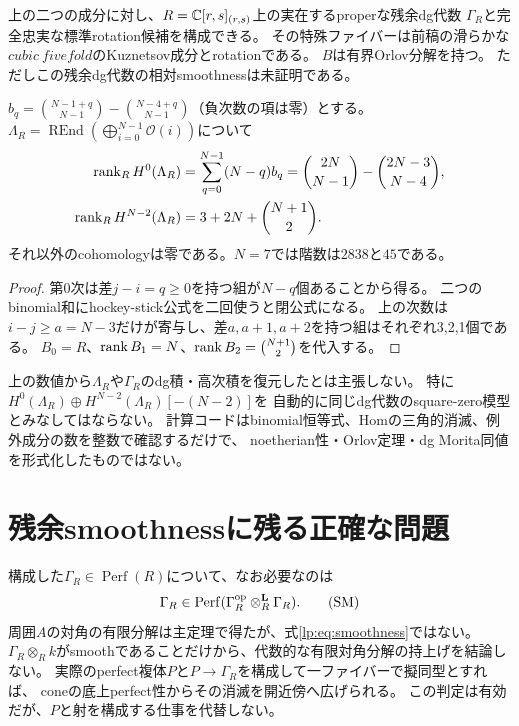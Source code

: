 \begin{corollary}[二つの成分の局所proper残余模型]\label{lp:cor:nonelliptic}
上の二つの成分に対し、$R=\mathbb C[r,s]_{(r,s)}$上の実在するproperな残余dg代数
$\Gamma_R$と完全忠実な標準rotation候補を構成できる。
その特殊ファイバーは前稿の滑らかな$cubic\ fivefold$のKuznetsov成分とrotationである。
$B$は有界Orlov分解を持つ。
ただしこの残余dg代数の相対smoothnessは未証明である。
\end{corollary}

\begin{proposition}[線束生成子のcohomology階数]\label{lp:prop:ranks}
$b_q=\binom{N-1+q}{N-1}-\binom{N-4+q}{N-1}$（負次数の項は零）とする。
$\Lambda_R=\operatorname{REnd}(\bigoplus_{i=0}^{N-1}\mathcal O(i))$について
\begin{align*}
 \operatorname{rank}_R H^0(\Lambda_R)&=\sum_{q=0}^{N-1}(N-q)b_q
 =\binom{2N}{N-1}-\binom{2N-3}{N-4},\\
 \operatorname{rank}_R H^{N-2}(\Lambda_R)&=3+2N+\binom{N+1}{2}.
\end{align*}
それ以外のcohomologyは零である。$N=7$では階数は$2838$と$45$である。
\end{proposition}
\begin{proof}
第0次は差$j-i=q\ge0$を持つ組が$N-q$個あることから得る。
二つのbinomial和にhockey-stick公式を二回使うと閉公式になる。
上の次数は$i-j\ge a=N-3$だけが寄与し、差$a,a+1,a+2$を持つ組はそれぞれ3,2,1個である。
$B_0=R$、$\operatorname{rank} B_1=N$、$\operatorname{rank} B_2=\binom{N+1}{2}$を代入する。
\end{proof}

\begin{remark}[cohomologyの表はdg積の代用品ではない]\label{lp:rem:ainfty}
上の数値から$\Lambda_R$や$\Gamma_R$のdg積・高次積を復元したとは主張しない。
特に$H^0(\Lambda_R)\oplus H^{N-2}(\Lambda_R)[-(N-2)]$を
自動的に同じdg代数のsquare-zero模型とみなしてはならない。
計算コードはbinomial恒等式、Homの三角的消滅、例外成分の数を整数で確認するだけで、
noetherian性・Orlov定理・dg Morita同値を形式化したものではない。
\end{remark}

\section{残余smoothnessに残る正確な問題}
\label{lp:sec:remaining}
構成した$\Gamma_R\in\operatorname{Perf}(R)$について、なお必要なのは
\[
 \Gamma_R\in\operatorname{Perf}(\Gamma_R^{\rm op}\otimes_R^{\mathbf L}\Gamma_R).
 \tag{SM}\label{lp:eq:smoothness}
\]
周囲$A$の対角の有限分解は主定理で得たが、式\eqref{lp:eq:smoothness}ではない。
$\Gamma_R\otimes_Rk$がsmoothであることだけから、代数的な有限対角分解の持上げを結論しない。
実際のperfect複体$P$と$P\to\Gamma_R$を構成して一ファイバーで擬同型とすれば、
coneの底上perfect性からその消滅を開近傍へ広げられる。
この判定は有効だが、$P$と射を構成する仕事を代替しない。

